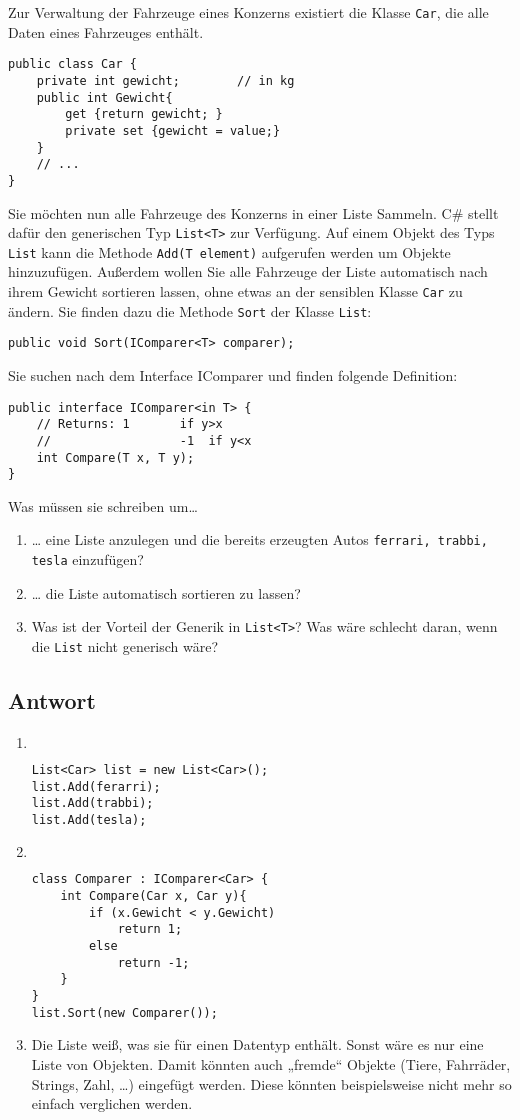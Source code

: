 Zur Verwaltung der Fahrzeuge eines Konzerns existiert die Klasse \lstinline$Car$, die alle Daten eines Fahrzeuges enthält.
\begin{lstlisting}[language={[Sharp]C}]
public class Car {
	private int gewicht;		// in kg
	public int Gewicht{
		get {return gewicht; }
		private set {gewicht = value;}
	}
	// ...
}
\end{lstlisting}

Sie möchten nun alle Fahrzeuge des Konzerns in einer Liste Sammeln. C\# stellt dafür den generischen Typ \lstinline$List<T>$ zur Verfügung. Auf einem Objekt des Typs \lstinline$List$ kann die Methode \lstinline$Add(T element)$ aufgerufen werden um Objekte hinzuzufügen. Außerdem wollen Sie alle Fahrzeuge der Liste automatisch nach ihrem Gewicht sortieren lassen, ohne etwas an der sensiblen Klasse \lstinline$Car$ zu ändern. Sie finden dazu die Methode \lstinline$Sort$ der Klasse \lstinline$List$:
\begin{lstlisting}[language={[Sharp]C}]
public void Sort(IComparer<T> comparer);
\end{lstlisting}
Sie suchen nach dem Interface IComparer und finden folgende Definition:
\begin{lstlisting}[language={[Sharp]C}]
public interface IComparer<in T> {
	// Returns:	1		if y>x
	//					-1	if y<x 
	int Compare(T x, T y);
}
\end{lstlisting}
Was müssen sie schreiben um…
\begin{enumerate}
\item … eine Liste anzulegen und die bereits erzeugten Autos \lstinline$ferrari, trabbi, tesla$ einzufügen?
\item … die Liste automatisch sortieren zu lassen?
\item Was ist der Vorteil der Generik in \lstinline$List<T>$? Was wäre schlecht daran, wenn die \lstinline$List$ nicht generisch wäre?
\end{enumerate}

\subsection{Antwort}
\begin{enumerate}
\item $ $
\begin{lstlisting}[language={[Sharp]C}]
List<Car> list = new List<Car>();
list.Add(ferarri);
list.Add(trabbi);
list.Add(tesla);
\end{lstlisting}
\item $ $
\begin{lstlisting}[language={[Sharp]C}]
class Comparer : IComparer<Car> {
	int Compare(Car x, Car y){
		if (x.Gewicht < y.Gewicht)
			return 1;
		else
			return -1;
	}
}
list.Sort(new Comparer());
\end{lstlisting}
\item Die Liste weiß, was sie für einen Datentyp enthält. Sonst wäre es nur eine Liste von Objekten. Damit könnten auch „fremde“ Objekte (Tiere, Fahrräder, Strings, Zahl, …) eingefügt werden. Diese könnten beispielsweise nicht mehr so einfach verglichen werden.
\end{enumerate}